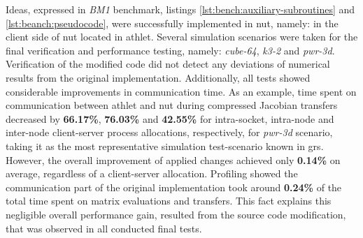 Ideas, expressed in \textit{BM1} benchmark, listings \ref{lst:bench:auxiliary-subroutines} and \ref{lst:beanch:pseudocode}, were successfully implemented in \acrshort{nut}, namely: in the client side of \acrshort{nut} located in \acrshort{athlet}. Several simulation scenarios were taken for the final verification and performance testing, namely: \textit{cube-64}, \textit{k3-2} and \textit{pwr-3d}. Verification of the modified code did not detect any deviations of numerical results from the original implementation. Additionally, all tests showed considerable improvements in communication time. As an example, time spent on communication between \acrshort{athlet} and \acrshort{nut} during compressed Jacobian transfers decreased by \textbf{66.17\%}, \textbf{76.03\%} and \textbf{42.55\%} for intra-socket, intra-node and inter-node client-server process allocations, respectively, for \textit{pwr-3d} scenario, taking it as the most representative simulation test-scenario known in \acrshort{grs}. However, the overall improvement of applied changes achieved only \textbf{0.14\%} on average, regardless of a client-server allocation. Profiling showed the communication part of the original implementation took around \textbf{0.24\%} of the total time spent on matrix evaluations and transfers. This fact explains this negligible overall performance gain, resulted from the source code modification, that was observed in all conducted final tests.\\
